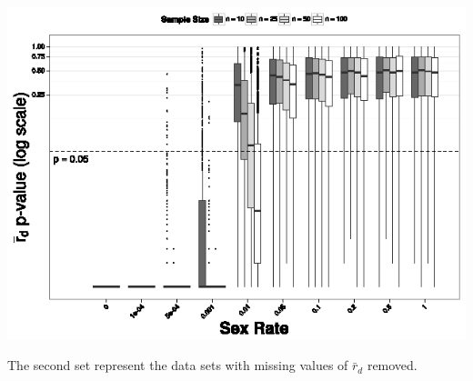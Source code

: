 \documentclass[letterpaper, 10pt]{article}
\begin{document}
\begin{center}
\includegraphics{figures/rbarD_pval.eps}\\
\end{center}

The second set represent the data sets with missing values of $\bar{r}_d$ removed.
\end{document}
